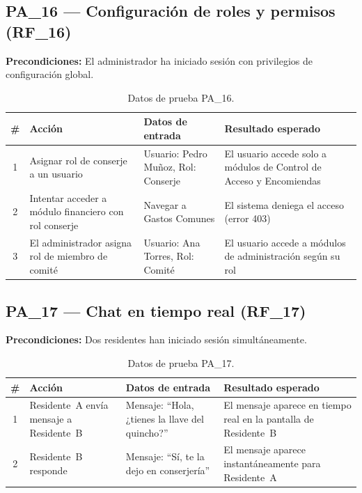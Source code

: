\subsection{PA\_16 — Configuración de roles y permisos (RF\_16)}

\textbf{Precondiciones:} El administrador ha iniciado sesión con privilegios de configuración global.

\begin{table}[H]
\centering
\small
\begin{tabular}{|c|p{}|p{}|p{}|}
\hline
\textbf{\#} & \textbf{Acción} & \textbf{Datos de entrada} & \textbf{Resultado esperado} \\ \hline
1 & Asignar rol de conserje a un usuario & Usuario: Pedro Muñoz, Rol: Conserje & El usuario accede solo a módulos de Control de Acceso y Encomiendas \\ \hline
2 & Intentar acceder a módulo financiero con rol conserje & Navegar a Gastos Comunes & El sistema deniega el acceso (error 403) \\ \hline
3 & El administrador asigna rol de miembro de comité & Usuario: Ana Torres, Rol: Comité & El usuario accede a módulos de administración según su rol \\ \hline
\end{tabular}
\caption{Datos de prueba PA\_16.}
\end{table}

\subsection{PA\_17 — Chat en tiempo real (RF\_17)}

\textbf{Precondiciones:} Dos residentes han iniciado sesión simultáneamente.

\begin{table}[H]
\centering
\small
\begin{tabular}{|c|p{}|p{}|p{}|}
\hline
\textbf{\#} & \textbf{Acción} & \textbf{Datos de entrada} & \textbf{Resultado esperado} \\ \hline
1 & Residente~A envía mensaje a Residente~B & Mensaje: ``Hola, ¿tienes la llave del quincho?'' & El mensaje aparece en tiempo real en la pantalla de Residente~B \\ \hline
2 & Residente~B responde & Mensaje: ``Sí, te la dejo en conserjería'' & El mensaje aparece instantáneamente para Residente~A \\ \hline
\end{tabular}
\caption{Datos de prueba PA\_17.}
\end{table}

